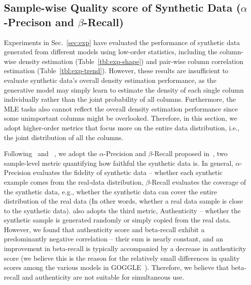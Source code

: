 \subsection{Sample-wise Quality score of Synthetic Data ($\alpha$-Precison and $\beta$-Recall)}\label{appendix:quality}
Experiments in Sec.~\ref{sec:exp} have evaluated the performance of synthetic data generated from different models using
low-order statistics, including the column-wise density estimation (Table~\ref{tbl:exp-shape}) and pair-wise column correlation estimation (Table~\ref{tbl:exp-trend}). However, these results are insufficient to evaluate synthetic data's overall density estimation performance, as the generative model may simply learn to estimate the density of each single column individually rather than the joint probability of all columns. Furthermore, the MLE tasks also cannot reflect the overall density estimation performance since some unimportant columns might be overlooked. Therefore, in this section, we adopt higher-order metrics that focus more on the entire data distribution, i.e., the joint distribution of all the columns.

Following~\citet{goggle} and ~\citet{faithful}, we adopt the $\alpha$-Precision and $\beta$-Recall proposed in~\citet{faithful}, two sample-level metric quantifying how faithful the synthetic data is. In general, $\alpha$-Precision evaluates the fidelity of synthetic data -- whether each synthetic example comes from the real-data distribution, $\beta$-Recall evaluates the coverage of the synthetic data, e.g., whether the synthetic data can cover the entire distribution of the real data (In other words, whether a real data sample is close to the synthetic data). \citet{goggle} also adopts the third metric, Authenticity -- whether the synthetic sample is generated randomly or simply copied from the real data. However, we found that authenticity score and beta-recall exhibit a predominantly negative correlation – their sum is nearly constant, and an improvement in beta-recall is typically accompanied by a decrease in authenticity score (we believe this is the reason for the relatively small differences in quality scores among the various models in GOGGLE~\citep{goggle}). Therefore, we believe that beta-recall and authenticity are not suitable for simultaneous use. 

